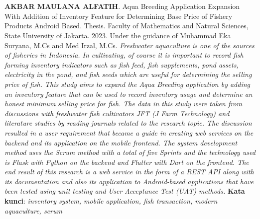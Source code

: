\chapter*{}

\begin{spacing}{1}
\textbf{AKBAR MAULANA ALFATIH}. Aqua Breeding Application Expansion With Addition of Inventory Feature for Determining Base Price of Fishery Products Android Based. Thesis. Faculty of Mathematics and Natural Sciences, State University of Jakarta. 2023. Under the guidance of Muhammad Eka Suryana, M.Cs and Med Irzal, M.Cs.
\newline
\newline
\textit{Freshwater aquaculture is one of the sources of fisheries in Indonesia. In cultivating, of course it is important to record fish farming inventory indicators such as fish feed, fish supplements, pond assets, electricity in the pond, and fish seeds which are useful for determining the selling price of fish. This study aims to expand the Aqua Breeding application by adding an inventory feature that can be used to record inventory usage and determine an honest minimum selling price for fish. The data in this study were taken from discussions with freshwater fish cultivators JFT (J Farm Technology) and literature studies by reading journals related to the research topic. The discussion resulted in a user requirement that became a guide in creating web services on the backend and its application on the mobile frontend. The system development method uses the Scrum method with a total of five Sprints and the technology used is Flask with Python on the backend and Flutter with Dart on the frontend. The end result of this research is a web service in the form of a REST API along with its documentation and also its application to Android-based applications that have been tested using unit testing and User Acceptance Test (UAT) methods.}
\newline
\newline
\noindent \textbf{Kata kunci}: \textit{inventory system, mobile application, fish transaction, modern aquaculture, scrum}
\end{spacing}